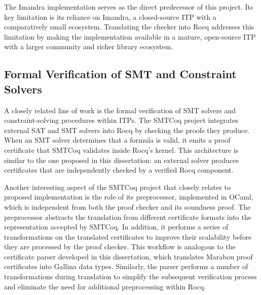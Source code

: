 The Imandra implementation serves as the direct predecessor of this project. Its key limitation is its reliance on Imandra, a closed-source ITP with a comparatively small ecosystem. Translating the checker into Rocq addresses this limitation by making the implementation available in a mature, open-source ITP with a larger community and richer library ecosystem.

\subsection{Formal Verification of SMT and Constraint Solvers}

A closely related line of work is the formal verification of SMT solvers and constraint-solving procedures within ITPs. The SMTCoq project \cite{smtcoq} integrates external SAT and SMT solvers into Rocq by checking the proofs they produce. When an SMT solver determines that a formula is valid, it emits a proof certificate that SMTCoq validates inside Rocq's kernel. This architecture is similar to the one proposed in this dissertation: an external solver produces certificates that are independently checked by a verified Rocq component. 

Another interesting aspect of the SMTCoq project that closely relates to proposed implementation is the role of its preprocessor, implemented in OCaml, which is independent from both the proof checker and its soundness proof. The preprocessor abstracts the translation from different certificate formats into the representation accepted by SMTCoq. In addition, it performs a series of transformations on the translated certificates to improve their scalability before they are processed by the proof checker. This workflow is analogous to the certificate parser developed in this dissertation, which translates Marabou proof certificates into Gallina data types. Similarly, the parser performs a number of transformations during translation to simplify the subsequent verification process and eliminate the need for additional preprocessing within Rocq.
